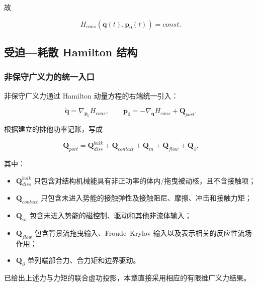 故

\begin{equation}
\label{eq:hamiltonian-3-30}
\boxed{H_{cons}\left( \mathbf{q}(t),\mathbf{p}_{0}(t) \right) = const.}
\end{equation}

\subsection{受迫---耗散 Hamilton 结构}\label{sec:hamiltonian-3-4}

\subsubsection{非保守广义力的统一入口}\label{sec:hamiltonian-3-4-1}

非保守广义力通过 Hamilton 动量方程的右端统一引入：

\begin{equation}
\label{eq:hamiltonian-3-31}
\boxed{\dot{\mathbf{q}} = \nabla_{\mathbf{p}_{0}}H_{cons},\quad\quad{\dot{\mathbf{p}}}_{0} = - \nabla_{\mathbf{q}}H_{cons} + \mathbf{Q}_{port}.}
\end{equation}

根据建立的排他功率记账，写成

\begin{equation}
\label{eq:hamiltonian-3-32}
\boxed{\mathbf{Q}_{port} = \mathbf{Q}_{diss}^{bulk} + \mathbf{Q}_{contact} + \mathbf{Q}_{in} + \mathbf{Q}_{flow} + \mathbf{Q}_{\partial}.}
\end{equation}

其中：

\begin{itemize}
\tightlist
\item
  \(\mathbf{Q}_{diss}^{bulk}\) 只包含对结构机械能具有非正功率的体内/拖曳被动核，且不含接触项；
\item
  \(\mathbf{Q}_{contact}\) 只包含未进入势能的接触弹性及接触阻尼、摩擦、冲击和接触力矩；
\item
  \(\mathbf{Q}_{in}\) 包含未进入势能的磁控制、驱动和其他非流体输入；
\item
  \(\mathbf{Q}_{flow}\) 包含背景流拖曳输入、Froude--Krylov 输入以及表示相关的反应性流场作用；
\item
  \(\mathbf{Q}_{\partial}\) 单列端部合力、合力矩和边界驱动。
\end{itemize}

已给出上述力与力矩的联合虚功投影，本章直接采用相应的有限维广义力结果。


